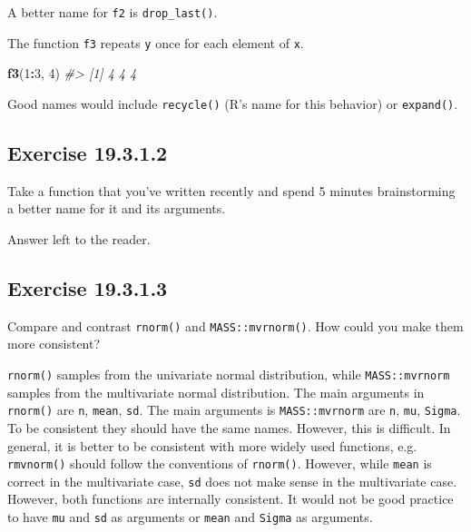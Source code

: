 \documentclass[]{book}
\newenvironment{Shaded}{\begin{snugshade}}{\end{snugshade}}
\newcommand{\CommentTok}[1]{\textcolor[rgb]{0.56,0.35,0.01}{\textit{#1}}}
\newcommand{\DecValTok}[1]{\textcolor[rgb]{0.00,0.00,0.81}{#1}}
\newcommand{\KeywordTok}[1]{\textcolor[rgb]{0.13,0.29,0.53}{\textbf{#1}}}
\newcommand{\NormalTok}[1]{#1}
\newcommand{\OperatorTok}[1]{\textcolor[rgb]{0.81,0.36,0.00}{\textbf{#1}}}
\theoremstyle{plain}
\theoremstyle{remark}
\begin{document}
A better name for \texttt{f2} is \texttt{drop\_last()}.

The function \texttt{f3} repeats \texttt{y} once for each element of \texttt{x}.

\begin{Shaded}
\begin{Highlighting}[]
\KeywordTok{f3}\NormalTok{(}\DecValTok{1}\OperatorTok{:}\DecValTok{3}\NormalTok{, }\DecValTok{4}\NormalTok{)}
\CommentTok{#> [1] 4 4 4}
\end{Highlighting}
\end{Shaded}

Good names would include \texttt{recycle()} (R's name for this behavior) or \texttt{expand()}.

\hypertarget{exercise-19.3.1.2}{%
\subsection*{\texorpdfstring{Exercise {19.3.1.2}}{Exercise 19.3.1.2}}\label{exercise-19.3.1.2}}

Take a function that you've written recently and spend 5 minutes brainstorming a better name for it and its arguments.

Answer left to the reader.

\hypertarget{exercise-19.3.1.3}{%
\subsection*{\texorpdfstring{Exercise {19.3.1.3}}{Exercise 19.3.1.3}}\label{exercise-19.3.1.3}}

Compare and contrast \texttt{rnorm()} and \texttt{MASS::mvrnorm()}. How could you make them more consistent?

\texttt{rnorm()} samples from the univariate normal distribution, while \texttt{MASS::mvrnorm}
samples from the multivariate normal distribution. The main arguments in
\texttt{rnorm()} are \texttt{n}, \texttt{mean}, \texttt{sd}. The main arguments is \texttt{MASS::mvrnorm} are \texttt{n},
\texttt{mu}, \texttt{Sigma}. To be consistent they should have the same names. However, this
is difficult. In general, it is better to be consistent with more widely used
functions, e.g. \texttt{rmvnorm()} should follow the conventions of \texttt{rnorm()}. However,
while \texttt{mean} is correct in the multivariate case, \texttt{sd} does not make sense in
the multivariate case. However, both functions are internally consistent.
It would not be good practice to have \texttt{mu} and \texttt{sd} as arguments or \texttt{mean} and \texttt{Sigma} as arguments.
\end{document}
